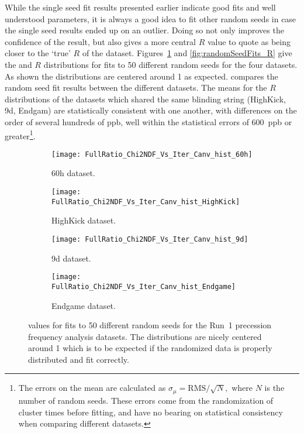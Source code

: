 While the single seed fit results presented earlier indicate good fits and well understood parameters, it is always a good idea to fit other random seeds in case the single seed results ended up on an outlier. Doing so not only improves the confidence of the result, but also gives a more central $R$ value to quote as being closer to the `true' $R$ of the dataset. Figures~\ref{fig:randomSeedFits_chi2} and \ref{fig:randomSeedFits_R} give the \chisq and $R$ distributions for fits to 50 different random seeds for the four datasets. As shown the \chisq distributions are centered around 1 as expected.  compares the random seed fit results between the different datasets. The means for the $R$ distributions of the datasets which shared the same blinding string (HighKick, 9d, Endgam) are statistically consistent with one another, with differences on the order of several hundreds of ppb, well within the statistical errors of \SI{600}{ppb} or greater\footnote{The errors on the mean are calculated as $\sigma_{\mu} = \text{RMS}/\sqrt{N},$ where $N$ is the number of random seeds. These errors come from the randomization of cluster times before fitting, and have no bearing on statistical consistency when comparing different datasets.}.



\begin{figure}
\centering
    \begin{subfigure}[]{0.45\textwidth}
        \centering
        \texttt{[image: FullRatio\_Chi2NDF\_Vs\_Iter\_Canv\_hist\_60h]}
        \caption{60h dataset.}
    \end{subfigure}%
    \begin{subfigure}[]{0.45\textwidth}
        \centering
        \texttt{[image: FullRatio\_Chi2NDF\_Vs\_Iter\_Canv\_hist\_HighKick]}
        \caption{HighKick dataset.}
    \end{subfigure}

    \begin{subfigure}[]{0.45\textwidth}
        \centering
        \texttt{[image: FullRatio\_Chi2NDF\_Vs\_Iter\_Canv\_hist\_9d]}
        \caption{9d dataset.}
    \end{subfigure}%
    \begin{subfigure}[]{0.45\textwidth}
        \centering
        \texttt{[image: FullRatio\_Chi2NDF\_Vs\_Iter\_Canv\_hist\_Endgame]}
        \caption{Endgame dataset.}
    \end{subfigure}
\caption[\chisq's for fits to many random seeds]{\chisq values for fits to 50 different random seeds for the Run~1 precession frequency analysis datasets. The distributions are nicely centered around 1 which is to be expected if the randomized data is properly distributed and fit correctly.}
\label{fig:randomSeedFits_chi2}
\end{figure}


